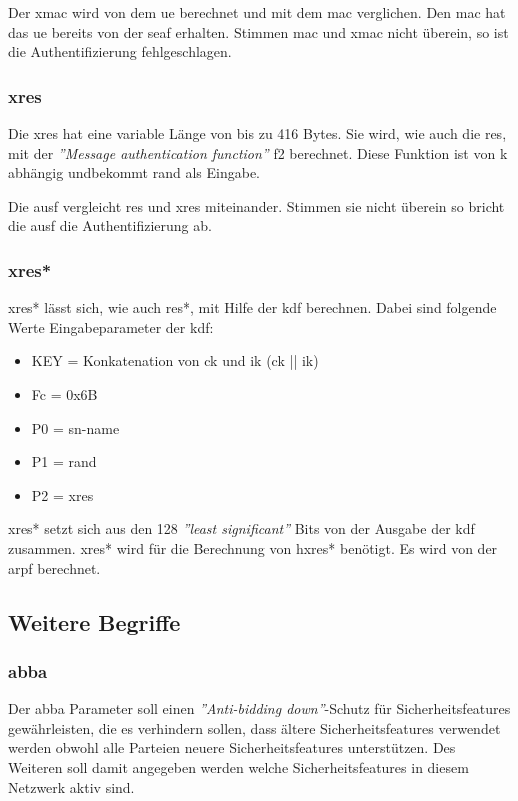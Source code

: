Der \gls{xmac} wird von dem \gls{ue} berechnet und mit dem \gls{mac} verglichen. 
Den \gls{mac} hat das \gls{ue} bereits von der \gls{seaf} erhalten.
Stimmen \gls{mac} und \gls{xmac} nicht \"uberein, so ist die Authentifizierung fehlgeschlagen. %

\subsubsection{\gls{xres}}
Die \gls{xres} hat eine variable L\"ange von bis zu 416 Bytes. %
Sie wird, wie auch die \gls{res}, mit der \textit{''Message authentication function''} f2 berechnet. 
Diese Funktion ist von \gls{k} abh\"angig undbekommt \gls{rand} als Eingabe. %

Die \gls{ausf} vergleicht \gls{res} und \gls{xres} miteinander.
Stimmen sie nicht \"uberein so bricht die \gls{ausf} die Authentifizierung ab. %

\subsubsection{\gls{xres*}}
\gls{xres*} l\"asst sich, wie auch \gls{res*}, mit Hilfe der \gls{kdf} berechnen.
Dabei sind folgende Werte Eingabeparameter der \gls{kdf}: %
\begin{itemize}
\item KEY = Konkatenation von \gls{ck} und \gls{ik} (\gls{ck} || \gls{ik})
\item Fc = 0x6B
\item P0 = \gls{sn-name}
\item P1 = \gls{rand}
\item P2 = \gls{xres}
\end{itemize}

\gls{xres*} setzt sich aus den 128 \textit{''least significant''} Bits von der Ausgabe der \gls{kdf} zusammen.
\gls{xres*} wird f\"ur die Berechnung von \gls{hxres*} ben\"otigt.
Es wird von der \gls{arpf} berechnet.


\subsection{Weitere Begriffe}

\subsubsection{\gls{abba}}
Der \gls{abba} Parameter soll einen \textit{''Anti-bidding down''}-Schutz f\"ur Sicherheitsfeatures gew\"ahrleisten, die es verhindern sollen, dass \"altere Sicherheitsfeatures verwendet werden obwohl alle Parteien neuere Sicherheitsfeatures unterst\"utzen. %
Des Weiteren soll damit angegeben werden welche Sicherheitsfeatures in diesem Netzwerk aktiv sind.

